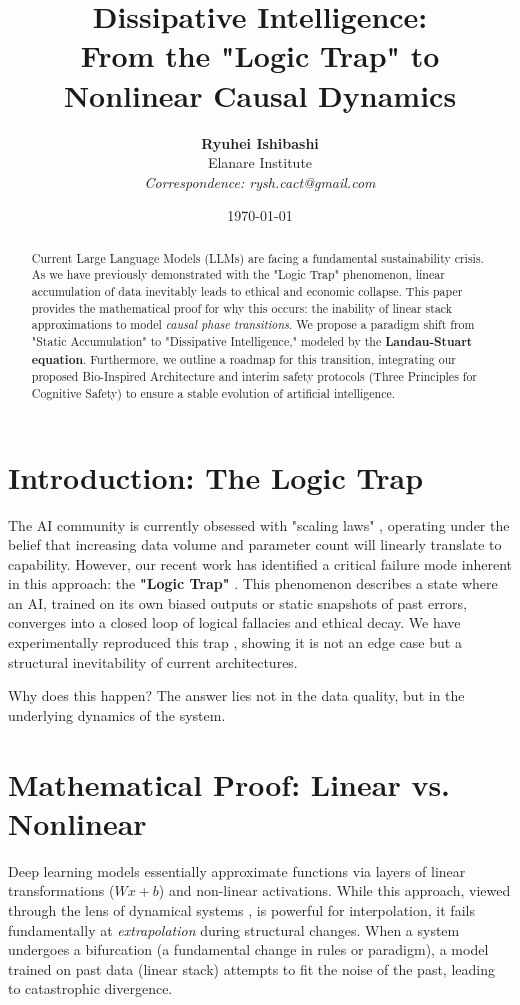 \documentclass[twocolumn, 10pt, a4paper]{article}
\title{\textbf{\Large Dissipative Intelligence: \\From the "Logic Trap" to Nonlinear Causal Dynamics}}
\author{
    \textbf{Ryuhei Ishibashi}
    \\
    \small Elanare Institute \\
    \small \textit{Correspondence: rysh.cact@gmail.com}
}
\date{\today}
\begin{document}
\maketitle

\begin{abstract}
Current Large Language Models (LLMs) are facing a fundamental sustainability crisis. As we have previously demonstrated with the "Logic Trap" phenomenon, linear accumulation of data inevitably leads to ethical and economic collapse. This paper provides the mathematical proof for why this occurs: the inability of linear stack approximations to model \textit{causal phase transitions}. We propose a paradigm shift from "Static Accumulation" to "Dissipative Intelligence," modeled by the \textbf{Landau-Stuart equation}. Furthermore, we outline a roadmap for this transition, integrating our proposed Bio-Inspired Architecture and interim safety protocols (Three Principles for Cognitive Safety) to ensure a stable evolution of artificial intelligence.
\end{abstract}

\section{Introduction: The Logic Trap}
The AI community is currently obsessed with "scaling laws" \cite{kaplan2020}, operating under the belief that increasing data volume and parameter count will linearly translate to capability. However, our recent work has identified a critical failure mode inherent in this approach: the \textbf{"Logic Trap"} \cite{logictrap_main, self_affirmation_trap}.
This phenomenon describes a state where an AI, trained on its own biased outputs or static snapshots of past errors, converges into a closed loop of logical fallacies and ethical decay. We have experimentally reproduced this trap \cite{self_affirmation_trap}, showing it is not an edge case but a structural inevitability of current architectures.

Why does this happen? The answer lies not in the data quality, but in the underlying dynamics of the system.

\section{Mathematical Proof: Linear vs. Nonlinear}
Deep learning models essentially approximate functions via layers of linear transformations ($Wx+b$) and non-linear activations. While this approach, viewed through the lens of dynamical systems \cite{weinan2017}, is powerful for interpolation, it fails fundamentally at \textit{extrapolation} during structural changes. When a system undergoes a bifurcation (a fundamental change in rules or paradigm), a model trained on past data (linear stack) attempts to fit the noise of the past, leading to catastrophic divergence.
\end{document}

